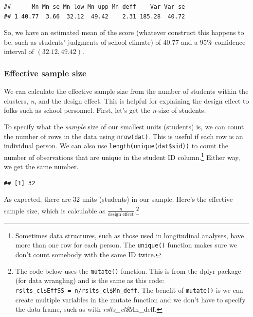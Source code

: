 \documentclass[
]{article}
\newenvironment{Shaded}{\begin{snugshade}}{\end{snugshade}}
\newcommand{\KeywordTok}[1]{\textcolor[rgb]{0.13,0.29,0.53}{\textbf{#1}}}
\newcommand{\NormalTok}[1]{#1}
\newcommand{\OperatorTok}[1]{\textcolor[rgb]{0.81,0.36,0.00}{\textbf{#1}}}
\newcommand{\StringTok}[1]{\textcolor[rgb]{0.31,0.60,0.02}{#1}}
\begin{document}
\begin{verbatim}
##      Mn Mn_se Mn_low Mn_upp Mn_deff    Var Var_se
## 1 40.77  3.66  32.12  49.42    2.31 185.28  40.72
\end{verbatim}

So, we have an estimated mean of the score (whatever construct this happens to be, such as students' judgments of school climate) of \(40.77\) and a 95\% confidence interval of \(( 32.12, 49.42)\).

\hypertarget{effective-sample-size}{%
\subsubsection{Effective sample size}\label{effective-sample-size}}

We can calculate the effective sample size from the number of students within the clusters, \emph{n}, and the design effect. This is helpful for explaining the design effect to folks such as school personnel. First, let's get the \emph{n}-size of students.

To specify what the \emph{sample} size of our smallest units (students) is, we can count the number of rows in the data using \texttt{nrow(dat)}. This is useful if each row is an individual person. We can also use \texttt{length(unique(dat\$sid))} to count the number of observations that are unique in the student ID column.\footnote{Sometimes data structures, such as those used in longitudinal analyses, have more than one row for each person. The \texttt{unique()} function makes sure we don't count somebody with the same ID twice.} Either way, we get the same number.

\begin{Shaded}
\end{Shaded}

\begin{verbatim}
## [1] 32
\end{verbatim}

As expected, there are 32 units (students) in our sample. Here's the effective sample size, which is calculable as \(\frac{n}{\text{design effect}}\).\footnote{The code below uses the \texttt{mutate()} function. This is from the dplyr package (for data wrangling) and is the same as this code: \texttt{rslts\_cl\$EffSS\ =\ n/rslts\_cl\$Mn\_deff}. The benefit of \texttt{mutate()} is we can create multiple variables in the mutate function and we don't have to specify the data frame, such as with \emph{rslts\_cl\$}Mn\_deff.}
\end{document}
